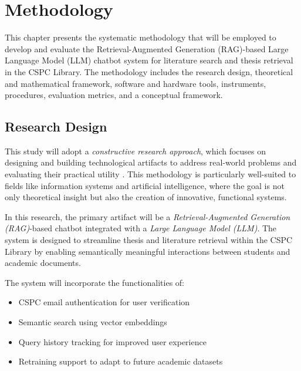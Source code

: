 
\chapter{Methodology}
\begin{refsection}
 
This chapter presents the systematic methodology that will be employed to develop and evaluate the Retrieval-Augmented Generation (RAG)-based Large Language Model (LLM) chatbot system for literature search and thesis retrieval in the CSPC Library. The methodology includes the research design, theoretical and mathematical framework, software and hardware tools, instruments, procedures, evaluation metrics, and a conceptual framework.

\section{Research Design}

This study will adopt a \textit{constructive research approach}, which focuses on designing and building technological artifacts to address real-world problems and evaluating their practical utility \citeauthor{lukka2003cons} \citeyear{lukka2003cons}. This methodology is particularly well-suited to fields like information systems and artificial intelligence, where the goal is not only theoretical insight but also the creation of innovative, functional systems.

In this research, the primary artifact will be a \textit{Retrieval-Augmented Generation (RAG)}-based chatbot integrated with a \textit{Large Language Model (LLM)}. The system is designed to streamline thesis and literature retrieval within the CSPC Library by enabling semantically meaningful interactions between students and academic documents. 

The system will incorporate the functionalities of:

\begin{samepage}
\begin{itemize}
    \item CSPC email authentication for user verification
    \item Semantic search using vector embeddings
    \item Query history tracking for improved user experience
    \item Retraining support to adapt to future academic datasets
\end{itemize}
\end{samepage}



\end{refsection}
